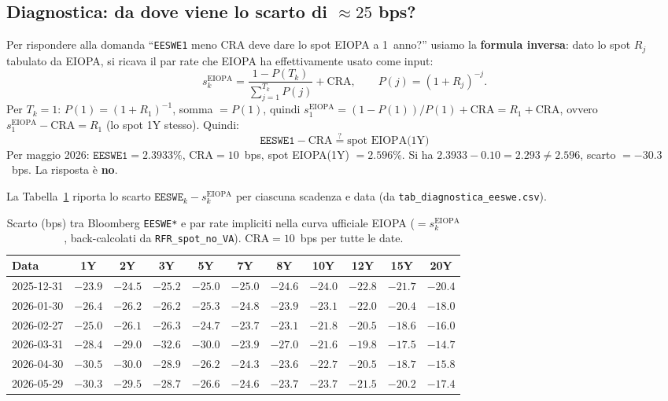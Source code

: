 \documentclass[11pt,a4paper]{article}
\theoremstyle{plain}
\theoremstyle{definition}
\theoremstyle{remark}
\newcommand{\CRA}{\ensuremath{\mathrm{CRA}}}
\begin{document}
\subsection{Diagnostica: da dove viene lo scarto di $\approx 25$ bps?}
\label{sec:validazione-diagn}

Per rispondere alla domanda ``\texttt{EESWE1} meno CRA deve dare lo spot EIOPA a 1~anno?''
usiamo la \textbf{formula inversa}: dato lo spot $R_j$ tabulato da EIOPA, si ricava il
par rate che EIOPA ha effettivamente usato come input:
\[
  s_k^{\text{EIOPA}} = \frac{1 - P(T_k)}{\displaystyle\sum_{j=1}^{T_k} P(j)} + \CRA,
  \qquad P(j) = (1 + R_j)^{-j}.
\]
Per $T_k = 1$: $P(1) = (1+R_1)^{-1}$, somma $= P(1)$, quindi
$s_1^{\text{EIOPA}} = (1-P(1))/P(1) + \CRA = R_1 + \CRA$, ovvero
$s_1^{\text{EIOPA}} - \CRA = R_1$ (lo spot 1Y stesso). Quindi:
\[
  \boxed{\;\texttt{EESWE1} - \CRA \stackrel{?}{=} \text{spot EIOPA(1Y)}\;}
\]
Per maggio 2026: $\texttt{EESWE1} = 2.3933\%$, $\CRA = 10$~bps,
spot EIOPA(1Y) $= 2.596\%$. Si ha $2.3933 - 0.10 = 2.293 \ne 2.596$, scarto $= -30.3$~bps.
La risposta \`e \textbf{no}.

La Tabella~\ref{tab:diagn} riporta lo scarto $\texttt{EESWE}_k - s_k^{\text{EIOPA}}$ per
ciascuna scadenza e data (da \texttt{tab\_diagnostica\_eeswe.csv}).

\begin{table}[H]
\centering\footnotesize
\caption{Scarto (bps) tra Bloomberg \texttt{EESWE*} e par rate impliciti nella curva
ufficiale EIOPA ($= s_k^{\text{EIOPA}}$, back-calcolati da \texttt{RFR\_spot\_no\_VA}).
$\CRA = 10$~bps per tutte le date.}
\label{tab:diagn}
\renewcommand{\arraystretch}{1.2}
\setlength{\tabcolsep}{4pt}
\begin{tabular}{lcccccccccc}
\toprule
\textbf{Data} & 1Y & 2Y & 3Y & 5Y & 7Y & 8Y & 10Y & 12Y & 15Y & 20Y\\
\midrule
\rowcolor{rowtint}2025-12-31 & $-23.9$ & $-24.5$ & $-25.2$ & $-25.0$ & $-25.0$ & $-24.6$ & $-24.0$ & $-22.8$ & $-21.7$ & $-20.4$\\
2026-01-30 & $-26.4$ & $-26.2$ & $-26.2$ & $-25.3$ & $-24.8$ & $-23.9$ & $-23.1$ & $-22.0$ & $-20.4$ & $-18.0$\\
\rowcolor{rowtint}2026-02-27 & $-25.0$ & $-26.1$ & $-26.3$ & $-24.7$ & $-23.7$ & $-23.1$ & $-21.8$ & $-20.5$ & $-18.6$ & $-16.0$\\
2026-03-31 & $-28.4$ & $-29.0$ & $-32.6$ & $-30.0$ & $-23.9$ & $-27.0$ & $-21.6$ & $-19.8$ & $-17.5$ & $-14.7$\\
\rowcolor{rowtint}2026-04-30 & $-30.5$ & $-30.0$ & $-28.9$ & $-26.2$ & $-24.3$ & $-23.6$ & $-22.7$ & $-20.5$ & $-18.7$ & $-15.8$\\
2026-05-29 & $-30.3$ & $-29.5$ & $-28.7$ & $-26.6$ & $-24.6$ & $-23.7$ & $-23.7$ & $-21.5$ & $-20.2$ & $-17.4$\\
\bottomrule
\end{tabular}
\end{table}
\end{document}
